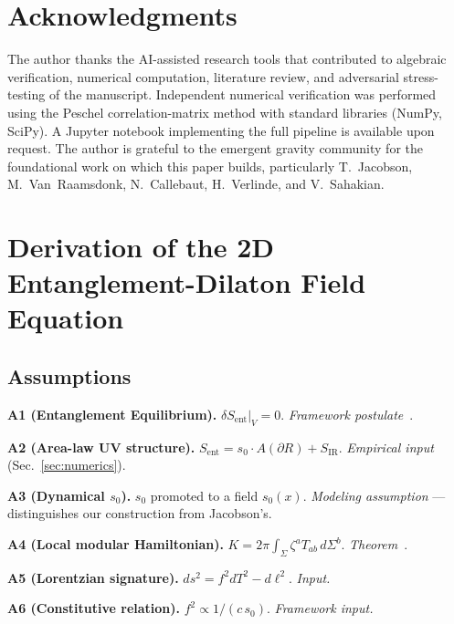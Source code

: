 \documentclass[aps,prd,twocolumn,superscriptaddress,nofootinbib,floatfix]{revtex4-2}
\newcommand{\sn}{s_0}
\newcommand{\Sent}{S_{\mathrm{ent}}}
\begin{document}
\section*{Acknowledgments}

The author thanks the AI-assisted research tools that contributed to algebraic verification, numerical computation, literature review, and adversarial stress-testing of the manuscript. Independent numerical verification was performed using the Peschel correlation-matrix method with standard libraries (NumPy, SciPy). A Jupyter notebook implementing the full pipeline is available upon request. The author is grateful to the emergent gravity community for the foundational work on which this paper builds, particularly T.~Jacobson, M.~Van~Raamsdonk, N.~Callebaut, H.~Verlinde, and V.~Sahakian.

\appendix
\section{Derivation of the 2D Entanglement-Dilaton Field Equation}
\label{app:derivation}

\subsection{Assumptions}

\textbf{A1 (Entanglement Equilibrium).} $\delta\Sent\big|_V = 0$. \emph{Framework postulate}~\cite{Jacobson2016}.

\textbf{A2 (Area-law UV structure).} $\Sent = \sn \cdot A(\partial R) + S_{\mathrm{IR}}$. \emph{Empirical input} (Sec.~\ref{sec:numerics}).

\textbf{A3 (Dynamical $\sn$).} $\sn$ promoted to a field $\sn(x)$. \emph{Modeling assumption} --- distinguishes our construction from Jacobson's.

\textbf{A4 (Local modular Hamiltonian).} $K = 2\pi\int_\Sigma \zeta^a T_{ab}\,d\Sigma^b$. \emph{Theorem}~\cite{BisognanoWichmann1976,CasiniHuertaMyers2011}.

\textbf{A5 (Lorentzian signature).} $ds^2 = f^2 dT^2 - d\ell^2$. \emph{Input.}

\textbf{A6 (Constitutive relation).} $f^2 \propto 1/(c\,\sn)$. \emph{Framework input.}
\end{document}
